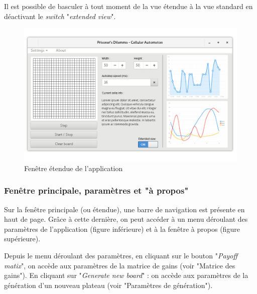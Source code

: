 \documentclass[a4paper]{article}
\begin{document}
Il est possible de basculer à tout moment de la vue étendue à la vue standard en déactivant le \textit{switch} "\textit{extended view}".

\vfill
\begin{figure}[htp]
    \centering
    \includegraphics[width=\linewidth]{interface/mainviewextended.png}
    \caption{Fenêtre étendue de l'application}
\end{figure}
\vfill

\pagebreak
\subsubsection{Fenêtre principale, paramètres et "à propos"}
Sur la fenêtre principale (ou étendue), une barre de navigation est présente en haut de page. Grâce à cette dernière, on peut accéder à un menu déroulant des paramètres de l'application (figure inférieure) et à la fenêtre à propos (figure supérieure).

Depuis le menu déroulant des paramètres, en cliquant sur le bouton "\textit{Payoff matix}", on accède aux paramètres de la matrice de gains (voir "Matrice des gains"). En cliquant sur "\textit{Generate new board}" : on accède aux paramètres de la génération d'un nouveau plateau (voir "Paramètres de génération").
\end{document}
